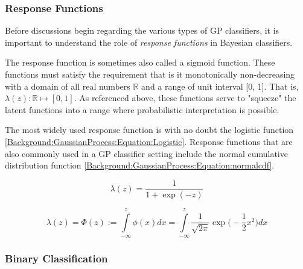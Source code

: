 			\subsubsection{Response Functions}
			
				Before discussions begin regarding the various types of GP classifiers, it is important to understand the role of \textit{response functions} in Bayesian classifiers.
				
				The response function is sometimes also called a sigmoid function. These functions must satisfy the requirement that is it monotonically non-decreasing with a domain of all real numbers $\mathbb{R}$ and a range of unit interval [0, 1]. That is, $\lambda(z): \mathbb{R} \mapsto [0, 1]$. As referenced above, these functions serve to "squeeze" the latent functions into a range where probabilistic interpretation is possible.
				
				The most widely used response function is with no doubt the logistic function \eqref{Background:GaussianProcess:Equation:Logistic}. Response functions that are also commonly used in a GP classifier setting include the normal cumulative distribution function \eqref{Background:GaussianProcess:Equation:normalcdf}.
				
				\begin{equation}
					\lambda(z) = \frac{1}{1 + \exp(-z)}
				\label{Background:GaussianProcess:Equation:Logistic}
				\end{equation}
				
				\begin{equation}
					\lambda(z) = \Phi(z) := \int\limits_{-\infty}^{z} \phi(x) dx =  \int\limits_{-\infty}^{z} \frac{1}{\sqrt{2 \pi}} \exp\Big(- \frac{1}{2} x^{2}\Big) dx
				\label{Background:GaussianProcess:Equation:normalcdf}
				\end{equation}
				
			\subsubsection{Binary Classification}
			
